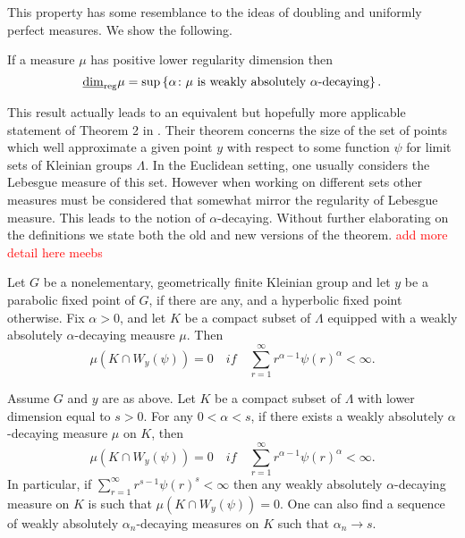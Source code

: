 This property has some resemblance to the ideas of doubling and uniformly perfect measures. We show the following.
\begin{proposition}\label{ch-quantifying:equiv-diophantine}
	If a measure $\mu$ has positive lower regularity dimension then 
	\[
	\underline{\dim}_{\textup{reg}} \mu = \sup\left\{\alpha \colon \mu \text{ is weakly absolutely $\alpha$-decaying}\right\}.
	\]
\end{proposition}

This result actually leads to an equivalent but hopefully more applicable statement of Theorem 2 in \cite{beres-sanju-al}. Their theorem concerns the size of the set of points which well approximate a given point $y$ with respect to some function $\psi$ for limit sets of Kleinian groups $\Lambda$. In the Euclidean setting, one usually considers the Lebesgue measure of this set. However when working on different sets other measures must be considered that somewhat mirror the regularity of Lebesgue measure. This leads to the notion of $\alpha$-decaying. Without further elaborating on the definitions we state both the old and new versions of the theorem. \textcolor{red}{add more detail here meebs }

\begin{theorem}
	Let $G$ be a nonelementary, geometrically finite Kleinian group and let $y$ be a parabolic fixed point of $G$, if there are any, and a hyperbolic fixed point otherwise. Fix $\alpha > 0$, and let $K$ be a compact subset of $\Lambda$ equipped with a weakly absolutely $\alpha$-decaying meausre $\mu$. Then
	\[
	\mu(K\cap W_y(\psi)) = 0 \quad if \quad \sum_{r=1}^\infty r^{\alpha-1} \psi(r)^{\alpha} < \infty.
	\]
\end{theorem}

\begin{theorem}
	Assume $G$ and $y$ are as above. Let $K$ be a compact subset of $\Lambda$ with lower dimension equal to $s > 0$. For any $0 < \alpha < s$, if there exists a weakly absolutely $\alpha$-decaying measure $\mu$ on $K$, then
	\[
	\mu(K\cap W_y(\psi)) = 0 \quad if \quad \sum_{r=1}^\infty r^{\alpha-1} \psi(r)^{\alpha} < \infty.
	\]
	In particular, if  $\sum_{r=1}^\infty r^{s-1} \psi(r)^{s} < \infty$ then any weakly absolutely $\alpha$-decaying measure on $K$ is such that $\mu(K\cap W_y(\psi)) = 0$. One can also find a sequence of weakly absolutely $\alpha_n$-decaying measures on $K$ such that $\alpha_n \rightarrow s$. 
\end{theorem}

